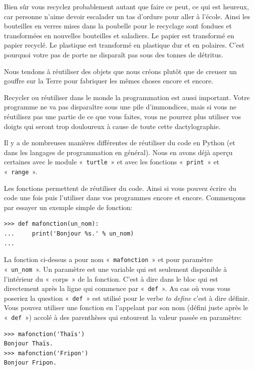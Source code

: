 Bien sûr vous recyclez probablement autant que faire ce peut, ce qui est heureux, car personne n'aime devoir escalader un tas d'ordure pour aller à l'école. Ainsi les bouteilles en verres mises dans la poubelle pour le recyclage sont fondues et transformées en nouvelles bouteilles et saladiers. Le papier est transformé en papier recyclé. Le plastique est transformé en plastique dur et en polaires. C'est pourquoi votre pas de porte ne disparaît pas sous des tonnes de détritus.

Nous tendons à réutiliser des objets que nous créons plutôt que de creuser un gouffre sur la Terre pour fabriquer les mêmes choses encore et encore.

Recycler ou réutiliser dans le monde la programmation est aussi important. Votre programme ne va pas disparaître sous une pile d'immondices, mais si vous ne réutilisez pas une partie de ce que vous faites, vous ne pourrez plus utiliser vos doigts qui seront trop douloureux à cause de toute cette dactylographie.

Il y a de nombreuses manières différentes de réutiliser du code en Python (et dans les langages de programmation en général). Nous en avons déjà aperçu certaines avec le module «~\texttt{turtle}~» et avec les fonctions «~\texttt{print}~» et «~\texttt{range}~».

Les fonctions permettent de réutiliser du code. Ainsi si vous pouvez écrire du code une fois puis l'utiliser dans vos programmes encore et encore. Commençons par essayer un exemple simple de fonction:

\begin{Verbatim}[frame=single,rulecolor=\color{mbleu}, label=à taper]
>>> def mafonction(un_nom):
...     print('Bonjour %s.' % un_nom)
...
\end{Verbatim}

La fonction ci-dessus a pour nom «~\texttt{mafonction}~» et pour paramètre «~\texttt{un\_nom}~».
Un paramètre est une variable qui est seulement disponible à l'intérieur du «~corps~» de la fonction. 
C'est à dire dans le bloc qui est directement après la ligne qui commence par «~\texttt{def}~». Au cas où vous vous poseriez la question «~\texttt{def}~» est utilisé pour le verbe \emph{to define} c'est à dire définir. Vous pouvez utiliser une fonction en l'appelant par son nom (défini juste après le «~\texttt{def}~») accolé à des parenthèses  qui entourent la valeur passée en paramètre:

\begin{Verbatim}[frame=single,rulecolor=\color{mbleu}, label=à taper]
>>> mafonction('Thaïs')
Bonjour Thaïs.
>>> mafonction('Fripon')
Bonjour Fripon.
\end{Verbatim}

